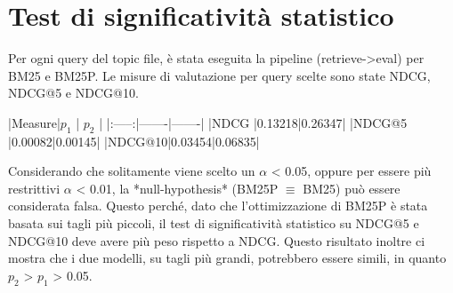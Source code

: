\section{Test di significatività statistico}
Per ogni query del topic file, è stata eseguita la pipeline (retrieve->eval) per BM25 e BM25P. Le misure di valutazione per query scelte sono state NDCG, NDCG@5 e NDCG@10.


|Measure|$p_1$     | $p_2$    |
|:-----:|-------|-------|
|NDCG   |0.13218|0.26347|
|NDCG@5 |0.00082|0.00145|
|NDCG@10|0.03454|0.06835|


Considerando che solitamente viene scelto un $\alpha$ < 0.05, oppure per essere più restrittivi $\alpha$ < 0.01, la *null-hypothesis* (BM25P $\equiv$ BM25) può essere considerata falsa.
Questo perché, dato che l'ottimizzazione di BM25P è stata basata sui tagli più piccoli, il test di significatività statistico su NDCG@5 e NDCG@10 deve avere più peso rispetto a NDCG. Questo risultato inoltre ci mostra che i due modelli, su tagli più grandi, potrebbero essere simili, in quanto $p_2$ > $p_1$ > 0.05.
